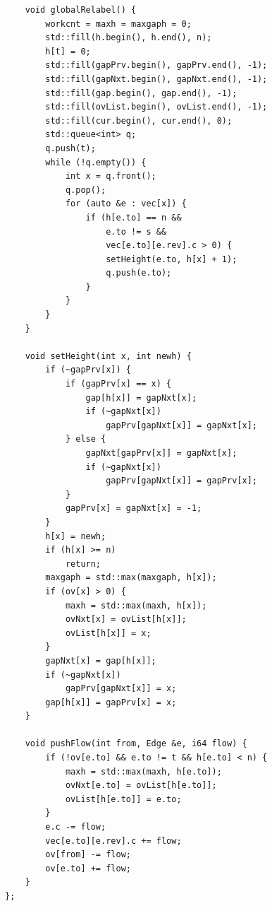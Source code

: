 \begin{lstlisting}
    void globalRelabel() {
        workcnt = maxh = maxgaph = 0;
        std::fill(h.begin(), h.end(), n);
        h[t] = 0;
        std::fill(gapPrv.begin(), gapPrv.end(), -1);
        std::fill(gapNxt.begin(), gapNxt.end(), -1);
        std::fill(gap.begin(), gap.end(), -1);
        std::fill(ovList.begin(), ovList.end(), -1);
        std::fill(cur.begin(), cur.end(), 0);
        std::queue<int> q;
        q.push(t);
        while (!q.empty()) {
            int x = q.front();
            q.pop();
            for (auto &e : vec[x]) {
                if (h[e.to] == n &&
                    e.to != s &&
                    vec[e.to][e.rev].c > 0) {
                    setHeight(e.to, h[x] + 1);
                    q.push(e.to);
                }
            }
        }
    }

    void setHeight(int x, int newh) {
        if (~gapPrv[x]) {
            if (gapPrv[x] == x) {
                gap[h[x]] = gapNxt[x];
                if (~gapNxt[x])
                    gapPrv[gapNxt[x]] = gapNxt[x];
            } else {
                gapNxt[gapPrv[x]] = gapNxt[x];
                if (~gapNxt[x])
                    gapPrv[gapNxt[x]] = gapPrv[x];
            }
            gapPrv[x] = gapNxt[x] = -1;
        }
        h[x] = newh;
        if (h[x] >= n)
            return;
        maxgaph = std::max(maxgaph, h[x]);
        if (ov[x] > 0) {
            maxh = std::max(maxh, h[x]);
            ovNxt[x] = ovList[h[x]];
            ovList[h[x]] = x;
        }
        gapNxt[x] = gap[h[x]];
        if (~gapNxt[x])
            gapPrv[gapNxt[x]] = x;
        gap[h[x]] = gapPrv[x] = x;
    }

    void pushFlow(int from, Edge &e, i64 flow) {
        if (!ov[e.to] && e.to != t && h[e.to] < n) {
            maxh = std::max(maxh, h[e.to]);
            ovNxt[e.to] = ovList[h[e.to]];
            ovList[h[e.to]] = e.to;
        }
        e.c -= flow;
        vec[e.to][e.rev].c += flow;
        ov[from] -= flow;
        ov[e.to] += flow;
    }
};
\end{lstlisting}